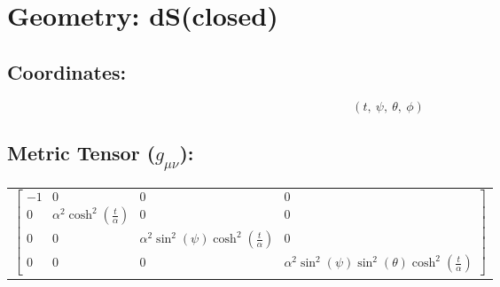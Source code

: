 \documentclass[12pt,a4paper]{article}
\begin{document}
\section*{Geometry: dS(closed)}
\subsection*{Coordinates:}
$$\left( t, \  \psi, \  \theta, \  \phi\right)$$

\subsection*{Metric Tensor ($g_{\mu\nu}$):}
\begin{longtable}{c}
$\left[\begin{matrix}-1 & 0 & 0 & 0\\0 & \alpha^{2} \cosh^{2}{\left(\frac{t}{\alpha} \right)} & 0 & 0\\0 & 0 & \alpha^{2} \sin^{2}{\left(\psi \right)} \cosh^{2}{\left(\frac{t}{\alpha} \right)} & 0\\0 & 0 & 0 & \alpha^{2} \sin^{2}{\left(\psi \right)} \sin^{2}{\left(\theta \right)} \cosh^{2}{\left(\frac{t}{\alpha} \right)}\end{matrix}\right]$ \\
\end{longtable}
\end{document}
